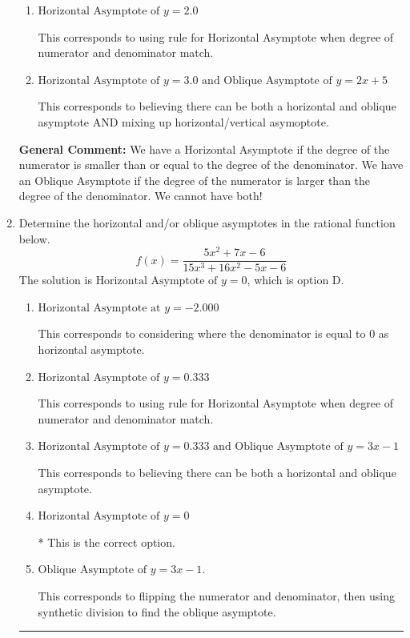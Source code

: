 \documentclass{extbook}[14pt]
\newcommand{\litem}[1]{\item #1

\rule{\textwidth}{0.4pt}}
\begin{document}
\begin{enumerate}
{\begin{enumerate}[label=\Alph*.]
This corresponds to believing there can be both a horizontal and oblique asymptote.
\item \( \text{Horizontal Asymptote of } y = 2.0  \)

This corresponds to using rule for Horizontal Asymptote when degree of numerator and denominator match.
\item \( \text{Horizontal Asymptote of } y = 3.0 \text{ and Oblique Asymptote of } y = 2x + 5 \)

This corresponds to believing there can be both a horizontal and oblique asymptote AND mixing up horizontal/vertical asymoptote.
\end{enumerate}

\textbf{General Comment:} We have a Horizontal Asymptote if the degree of the numerator is smaller than or equal to the degree of the denominator. We have an Oblique Asymptote if the degree of the numerator is larger than the degree of the denominator. We cannot have both!
}
\litem{
Determine the horizontal and/or oblique asymptotes in the rational function below.
\[ f(x) = \frac{5x^{2} +7 x -6}{15x^{3} +16 x^{2} -5 x -6} \]The solution is \( \text{Horizontal Asymptote of } y = 0 \), which is option D.\begin{enumerate}[label=\Alph*.]
\item \( \text{Horizontal Asymptote at } y = -2.000 \)

This corresponds to considering where the denominator is equal to 0 as horizontal asymptote.
\item \( \text{Horizontal Asymptote of } y = 0.333  \)

This corresponds to using rule for Horizontal Asymptote when degree of numerator and denominator match.
\item \( \text{Horizontal Asymptote of } y = 0.333 \text{ and Oblique Asymptote of } y = 3x -1 \)

This corresponds to believing there can be both a horizontal and oblique asymptote.
\item \( \text{Horizontal Asymptote of } y = 0 \)

* This is the correct option.
\item \( \text{Oblique Asymptote of } y = 3x -1. \)

This corresponds to flipping the numerator and denominator, then using synthetic division to find the oblique asymptote.
\end{enumerate}

}
\end{enumerate}
\end{document}
